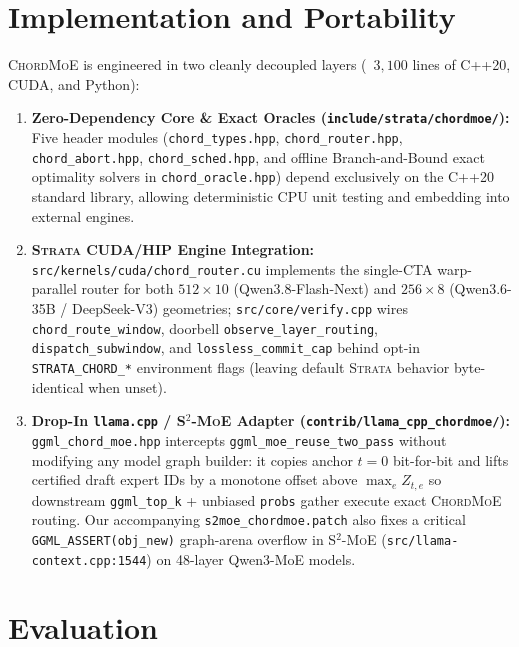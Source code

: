 \documentclass[10pt,twocolumn]{article}
\theoremstyle{definition}
\begin{document}
\section{Implementation and Portability}
\label{sec:impl}

\textsc{ChordMoE} is engineered in two cleanly decoupled layers (~$3,100$ lines of C++20, CUDA, and Python):
\begin{enumerate}
  \item \textbf{Zero-Dependency Core \& Exact Oracles (\texttt{include/strata/chordmoe/}):} Five header modules (\texttt{chord\_types.hpp}, \texttt{chord\_router.hpp}, \texttt{chord\_abort.hpp}, \texttt{chord\_sched.hpp}, and offline Branch-and-Bound exact optimality solvers in \texttt{chord\_oracle.hpp}) depend exclusively on the C++20 standard library, allowing deterministic CPU unit testing and embedding into external engines.
  \item \textbf{\textsc{Strata} CUDA/HIP Engine Integration:} \texttt{src/kernels/cuda/chord\_router.cu} implements the single-CTA warp-parallel router for both $512 \times 10$ (Qwen3.8-Flash-Next) and $256 \times 8$ (Qwen3.6-35B / DeepSeek-V3) geometries; \texttt{src/core/verify.cpp} wires \texttt{chord\_route\_window}, doorbell \texttt{observe\_layer\_routing}, \texttt{dispatch\_subwindow}, and \texttt{lossless\_commit\_cap} behind opt-in \texttt{STRATA\_CHORD\_*} environment flags (leaving default \textsc{Strata} behavior byte-identical when unset).
  \item \textbf{Drop-In \texttt{llama.cpp} / \textsc{S$^2$-MoE} Adapter (\texttt{contrib/llama\_cpp\_chordmoe/}):} \texttt{ggml\_chord\_moe.hpp} intercepts \texttt{ggml\_moe\_reuse\_two\_pass} without modifying any model graph builder: it copies anchor $t=0$ bit-for-bit and lifts certified draft expert IDs by a monotone offset above $\max_e Z_{t,e}$ so downstream \texttt{ggml\_top\_k} + unbiased \texttt{probs} gather execute exact \textsc{ChordMoE} routing. Our accompanying \texttt{s2moe\_chordmoe.patch} also fixes a critical \texttt{GGML\_ASSERT(obj\_new)} graph-arena overflow in \textsc{S$^2$-MoE} (\texttt{src/llama-context.cpp:1544}) on 48-layer Qwen3-MoE models.
\end{enumerate}

\section{Evaluation}
\label{sec:eval}
\end{document}
